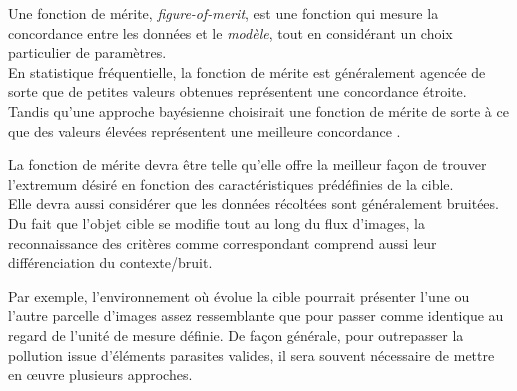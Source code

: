 \documentclass[a4paper,12pt]{report}
\begin{document}
Une fonction de mérite, \textit{figure-of-merit}, est une fonction qui mesure la concordance entre les données et le \textit{modèle}, tout en considérant un choix particulier de paramètres.\\

En statistique fréquentielle, la fonction de mérite est généralement agencée de sorte que de petites valeurs obtenues représentent une concordance étroite. Tandis qu'une approche bayésienne choisirait une fonction de mérite de sorte à ce que des valeurs élevées représentent une meilleure concordance \cite{n}.

La fonction de mérite devra être telle qu'elle offre la meilleur façon de trouver l'extremum désiré en fonction des caractéristiques prédéfinies de la cible.\\

Elle devra aussi considérer que les données récoltées sont généralement bruitées.
Du fait que l'objet cible se modifie tout au long du flux d'images, la reconnaissance des critères comme correspondant comprend aussi leur différenciation du contexte/bruit. 

Par exemple, l'environnement où évolue la cible pourrait présenter l'une ou l'autre parcelle d'images assez ressemblante que pour passer comme identique au regard de l'unité de mesure définie.
De façon générale, pour outrepasser la pollution issue d'éléments parasites valides, il sera souvent nécessaire de mettre en œuvre plusieurs approches.
\end{document}
